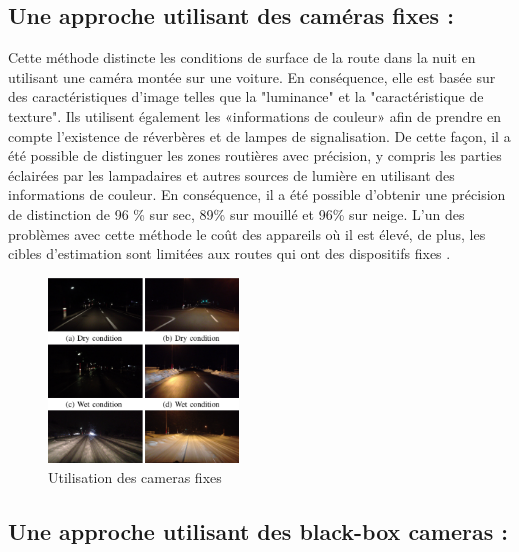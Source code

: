 \subsection{Une approche utilisant des caméras fixes : }
Cette méthode \cite{kawaiMethodDistinguishRoad2012} distincte  les conditions de surface de la route dans la nuit en utilisant une caméra montée sur une voiture.
En conséquence, elle est basée sur des caractéristiques d'image telles que la "luminance" et la "caractéristique de texture". 
Ils utilisent également les «informations de couleur» afin de prendre en compte l'existence de réverbères et de lampes de signalisation. De cette façon, il a été possible de distinguer les zones routières avec précision, y compris les parties éclairées par les lampadaires et autres sources de lumière en utilisant des informations de couleur. En conséquence, il a été possible d'obtenir une précision de distinction de 96 \% sur sec, 89\% sur mouillé et 96\% sur neige.
L'un des problèmes avec cette méthode le coût des appareils où il est élevé, de plus, les cibles d'estimation sont limitées aux routes qui ont des dispositifs fixes .
\begin{figure}[h!]
    \center
    \includegraphics[width=0.45\textwidth]{Images/chapter1/cameraFixe.jpg}
    \caption{Utilisation des cameras fixes}
    \end{figure}
   
\subsection{Une approche utilisant des black-box cameras :}

